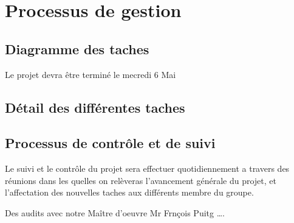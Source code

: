 
\section{Processus de gestion}
\subsection{Diagramme des taches}

Le projet devra être terminé le mecredi 6 Mai

\subsection{Détail des différentes taches}


\subsection{Processus de contrôle et de suivi}

Le suivi et le contrôle du projet sera effectuer quotidiennement a travers des réunions dans les quelles on relèveras l’avancement générale du projet, et l’affectation des nouvelles taches aux différents membre du groupe.

Des audits avec notre Maître d’oeuvre Mr Frnçois Puitg  ….



